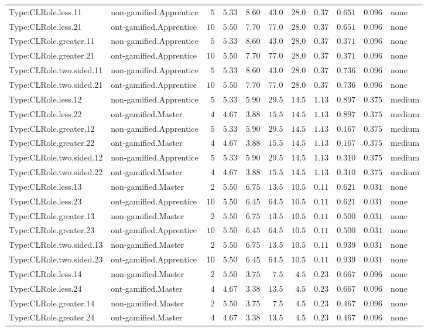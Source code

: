 \documentclass[6pt,a4paper]{article}
\begin{document}
{\begin{longtable}{llrrrrrrrrl}
Type:CLRole.less.11&non-gamified.Apprentice&$ 5$&$5.33$&$ 8.60$&$ 43.0$&$28.0$&$0.37$&$0.651$&$0.096$&none\tabularnewline
Type:CLRole.less.21&ont-gamified.Apprentice&$10$&$5.50$&$ 7.70$&$ 77.0$&$28.0$&$0.37$&$0.651$&$0.096$&none\tabularnewline
Type:CLRole.greater.11&non-gamified.Apprentice&$ 5$&$5.33$&$ 8.60$&$ 43.0$&$28.0$&$0.37$&$0.371$&$0.096$&none\tabularnewline
Type:CLRole.greater.21&ont-gamified.Apprentice&$10$&$5.50$&$ 7.70$&$ 77.0$&$28.0$&$0.37$&$0.371$&$0.096$&none\tabularnewline
Type:CLRole.two.sided.11&non-gamified.Apprentice&$ 5$&$5.33$&$ 8.60$&$ 43.0$&$28.0$&$0.37$&$0.736$&$0.096$&none\tabularnewline
Type:CLRole.two.sided.21&ont-gamified.Apprentice&$10$&$5.50$&$ 7.70$&$ 77.0$&$28.0$&$0.37$&$0.736$&$0.096$&none\tabularnewline
Type:CLRole.less.12&non-gamified.Apprentice&$ 5$&$5.33$&$ 5.90$&$ 29.5$&$14.5$&$1.13$&$0.897$&$0.375$&medium\tabularnewline
Type:CLRole.less.22&ont-gamified.Master&$ 4$&$4.67$&$ 3.88$&$ 15.5$&$14.5$&$1.13$&$0.897$&$0.375$&medium\tabularnewline
Type:CLRole.greater.12&non-gamified.Apprentice&$ 5$&$5.33$&$ 5.90$&$ 29.5$&$14.5$&$1.13$&$0.167$&$0.375$&medium\tabularnewline
Type:CLRole.greater.22&ont-gamified.Master&$ 4$&$4.67$&$ 3.88$&$ 15.5$&$14.5$&$1.13$&$0.167$&$0.375$&medium\tabularnewline
Type:CLRole.two.sided.12&non-gamified.Apprentice&$ 5$&$5.33$&$ 5.90$&$ 29.5$&$14.5$&$1.13$&$0.310$&$0.375$&medium\tabularnewline
Type:CLRole.two.sided.22&ont-gamified.Master&$ 4$&$4.67$&$ 3.88$&$ 15.5$&$14.5$&$1.13$&$0.310$&$0.375$&medium\tabularnewline
Type:CLRole.less.13&non-gamified.Master&$ 2$&$5.50$&$ 6.75$&$ 13.5$&$10.5$&$0.11$&$0.621$&$0.031$&none\tabularnewline
Type:CLRole.less.23&ont-gamified.Apprentice&$10$&$5.50$&$ 6.45$&$ 64.5$&$10.5$&$0.11$&$0.621$&$0.031$&none\tabularnewline
Type:CLRole.greater.13&non-gamified.Master&$ 2$&$5.50$&$ 6.75$&$ 13.5$&$10.5$&$0.11$&$0.500$&$0.031$&none\tabularnewline
Type:CLRole.greater.23&ont-gamified.Apprentice&$10$&$5.50$&$ 6.45$&$ 64.5$&$10.5$&$0.11$&$0.500$&$0.031$&none\tabularnewline
Type:CLRole.two.sided.13&non-gamified.Master&$ 2$&$5.50$&$ 6.75$&$ 13.5$&$10.5$&$0.11$&$0.939$&$0.031$&none\tabularnewline
Type:CLRole.two.sided.23&ont-gamified.Apprentice&$10$&$5.50$&$ 6.45$&$ 64.5$&$10.5$&$0.11$&$0.939$&$0.031$&none\tabularnewline
Type:CLRole.less.14&non-gamified.Master&$ 2$&$5.50$&$ 3.75$&$  7.5$&$ 4.5$&$0.23$&$0.667$&$0.096$&none\tabularnewline
Type:CLRole.less.24&ont-gamified.Master&$ 4$&$4.67$&$ 3.38$&$ 13.5$&$ 4.5$&$0.23$&$0.667$&$0.096$&none\tabularnewline
Type:CLRole.greater.14&non-gamified.Master&$ 2$&$5.50$&$ 3.75$&$  7.5$&$ 4.5$&$0.23$&$0.467$&$0.096$&none\tabularnewline
Type:CLRole.greater.24&ont-gamified.Master&$ 4$&$4.67$&$ 3.38$&$ 13.5$&$ 4.5$&$0.23$&$0.467$&$0.096$&none\tabularnewline

\end{longtable}}
\end{document}
